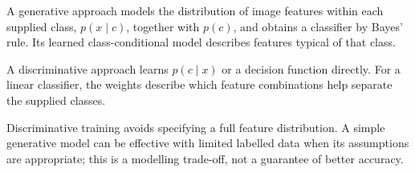 A generative approach models the distribution of image features within each supplied class, \(p(x\mid c)\), together with \(p(c)\), and obtains a classifier by Bayes' rule. Its learned class-conditional model describes features typical of that class.


A discriminative approach learns \(p(c\mid x)\) or a decision function directly. For a linear classifier, the weights describe which feature combinations help separate the supplied classes.


Discriminative training avoids specifying a full feature distribution. A simple generative model can be effective with limited labelled data when its assumptions are appropriate; this is a modelling trade-off, not a guarantee of better accuracy.

